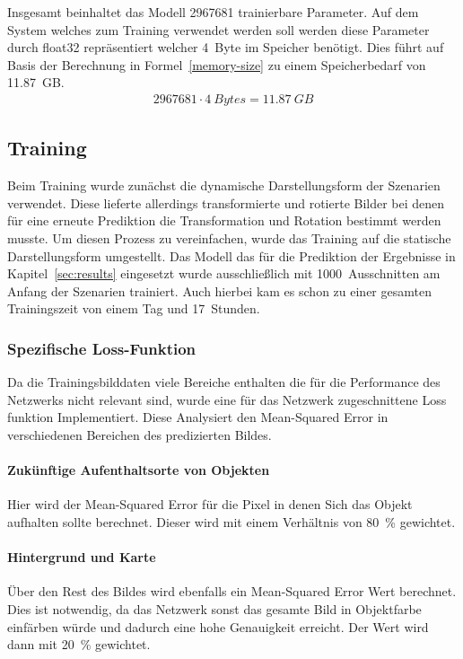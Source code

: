\documentclass[12pt]{article}
\begin{document}
            Insgesamt beinhaltet das Modell 2967681 trainierbare Parameter. 
            Auf dem System welches zum Training verwendet werden soll werden diese Parameter durch float32 repräsentiert welcher 4~Byte im Speicher benötigt.
            Dies führt auf Basis der Berechnung in Formel~\ref{memory-size} zu einem Speicherbedarf von 11.87~GB. 
            \begin{align}
                2967681 \cdot 4~Bytes = 11.87~GB
                \label{memory-size}
            \end{align}
    \pagebreak
    \subsection{Training}
        Beim Training wurde zunächst die dynamische Darstellungsform der Szenarien verwendet. 
        Diese lieferte allerdings transformierte und rotierte Bilder bei denen für eine erneute Prediktion die Transformation und Rotation bestimmt werden musste. 
        Um diesen Prozess zu vereinfachen, wurde das Training auf die statische Darstellungsform umgestellt.
        Das Modell das für die Prediktion der Ergebnisse in Kapitel~\ref{sec:results} eingesetzt wurde ausschließlich mit 1000~Ausschnitten am Anfang der Szenarien trainiert.
        Auch hierbei kam es schon zu einer gesamten Trainingszeit von einem Tag und 17~Stunden.
        \subsubsection{Spezifische Loss-Funktion}
	        Da die Trainingsbilddaten viele Bereiche enthalten die für die Performance des Netzwerks nicht relevant sind, 
            wurde eine für das Netzwerk zugeschnittene Loss funktion Implementiert. 
            Diese Analysiert den Mean-Squared Error in verschiedenen Bereichen des predizierten Bildes. 
            \paragraph{Zukünftige Aufenthaltsorte von Objekten} Hier wird der Mean-Squared Error für die Pixel in denen Sich das Objekt aufhalten sollte berechnet. 
            Dieser wird mit einem Verhältnis von 80~\% gewichtet.
            \paragraph{Hintergrund und Karte} Über den Rest des Bildes wird ebenfalls ein Mean-Squared Error Wert berechnet. 
            Dies ist notwendig, da das Netzwerk sonst das gesamte Bild in Objektfarbe einfärben würde und dadurch eine hohe Genauigkeit erreicht.
            Der Wert wird dann mit 20~\% gewichtet.
\end{document}
